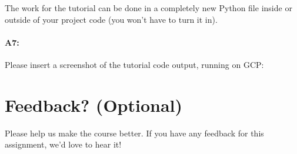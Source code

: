 The work for the tutorial can be done in a completely new Python file inside or outside of your project code (you won't have to turn it in).


\paragraph{A7:} Please insert a screenshot of the tutorial code output, running on GCP:





\pagebreak
\section*{Feedback? (Optional)}
Please help us make the course better. If you have any feedback for this assignment, we'd love to hear it!





